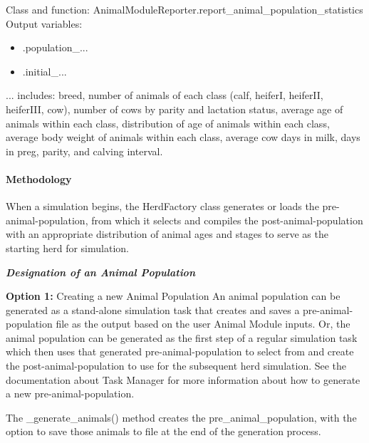 \begin{refsection}
Class and function: AnimalModuleReporter.report\_animal\_population\_statistics
Output variables: 
\begin{itemize}
    \item .population\_{...}
    \item .initial\_{...}
\end{itemize}

{...} includes: breed, number of animals of each class (calf, heiferI, heiferII, heiferIII, cow), number of cows by parity and lactation status, average age of animals within each class, distribution of age of animals within each class, average body weight of animals within each class, average cow days in milk, days in preg, parity, and calving interval. 




\paragraph{Methodology}

When a simulation begins, the HerdFactory class generates or loads the pre-animal-population, from which it selects and compiles the post-animal-population with an appropriate distribution of animal ages and stages to serve as the starting herd for simulation. 
\vspace{0.3cm}

\textbf{\textit{Designation of an Animal Population}}
\vspace{0.3cm}

\textbf{Option 1:} Creating a new Animal Population
An animal population can be generated as a stand-alone simulation task that creates and saves a pre-animal-population file  as the output based on the user Animal Module inputs. Or, the animal population can be generated as the first step of a regular simulation task which then uses that generated pre-animal-population to select from and create the post-animal-population to use for the subsequent herd simulation. See the documentation about Task Manager for more information about how to generate a new pre-animal-population. 
\vspace{0.2cm}

The \_generate\_animals() method creates the pre\_animal\_population, with the option to save those animals to file at the end of the generation process. 
\vspace{0.2cm}


\end{refsection}
